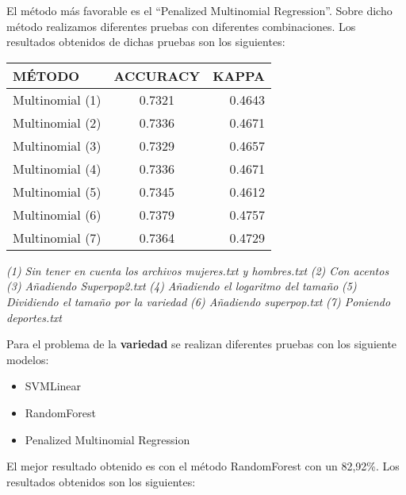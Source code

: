 \documentclass[11pt,a4paper]{article}
\begin{document}
El m\'etodo m\'as favorable es el “Penalized Multinomial Regression”.\newline
Sobre dicho m\'etodo realizamos diferentes pruebas con diferentes combinaciones.\newline
Los resultados obtenidos de dichas pruebas son los siguientes:

\begin{table}[htbp]
\begin{center}
\begin{tabular}[t]{|l |c |r|}
\hline
M\'ETODO & ACCURACY & KAPPA \\
\hline \hline
Multinomial (1) & 0.7321 & 0.4643 \\ \hline
Multinomial (2) & 0.7336 & 0.4671 \\ \hline
Multinomial (3) & 0.7329  & 0.4657  \\ \hline
Multinomial (4) & 0.7336 & 0.4671 \\ \hline
Multinomial (5) & 0.7345 & 0.4612  \\ \hline
Multinomial (6) & 0.7379  & 0.4757  \\ \hline
Multinomial (7) & 0.7364  & 0.4729  \\ \hline
\end{tabular}
\label{tabla:sencilla}
\end{center}
\end{table}
\textit {(1) Sin tener en cuenta los archivos mujeres.txt y hombres.txt}\newline
\textit {(2) Con acentos}\newline
\textit {(3) Añadiendo Superpop2.txt}\newline
\textit {(4) Añadiendo el logaritmo del tamaño}\newline
\textit {(5) Dividiendo el tamaño por la variedad}\newline
\textit {(6) Añadiendo superpop.txt}\newline
\textit {(7) Poniendo deportes.txt}\newline


Para el problema de la \textbf{variedad} se realizan diferentes pruebas con los siguiente modelos:

\begin{itemize}
 \item SVMLinear
 \item RandomForest
 \item Penalized Multinomial Regression
\end{itemize}
El mejor resultado obtenido es con el m\'etodo RandomForest con un 82,92\%.\newline
Los resultados obtenidos son los siguientes:
\end{document}
